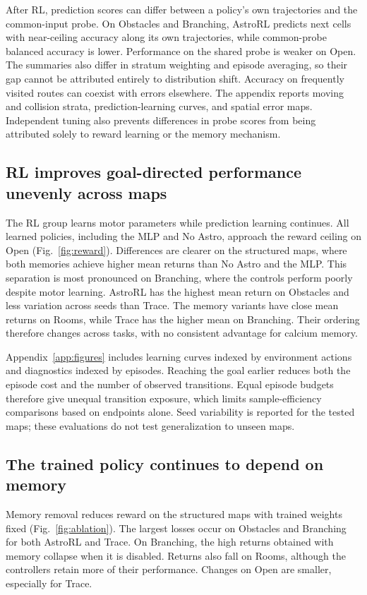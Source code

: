 After RL, prediction scores can differ between a policy's own trajectories and the common-input probe. On Obstacles and Branching, AstroRL predicts next cells with near-ceiling accuracy along its own trajectories, while common-probe balanced accuracy is lower. Performance on the shared probe is weaker on Open. The summaries also differ in stratum weighting and episode averaging, so their gap cannot be attributed entirely to distribution shift. Accuracy on frequently visited routes can coexist with errors elsewhere. The appendix reports moving and collision strata, prediction-learning curves, and spatial error maps. Independent tuning also prevents differences in probe scores from being attributed solely to reward learning or the memory mechanism.



\subsection{RL improves goal-directed performance unevenly across maps}
The RL group learns motor parameters while prediction learning continues. All learned policies, including the MLP and No Astro, approach the reward ceiling on Open (Fig.~\ref{fig:reward}). Differences are clearer on the structured maps, where both memories achieve higher mean returns than No Astro and the MLP. This separation is most pronounced on Branching, where the controls perform poorly despite motor learning. AstroRL has the highest mean return on Obstacles and less variation across seeds than Trace. The memory variants have close mean returns on Rooms, while Trace has the higher mean on Branching. Their ordering therefore changes across tasks, with no consistent advantage for calcium memory.

Appendix~\ref{app:figures} includes learning curves indexed by environment actions and diagnostics indexed by episodes. Reaching the goal earlier reduces both the episode cost and the number of observed transitions. Equal episode budgets therefore give unequal transition exposure, which limits sample-efficiency comparisons based on endpoints alone. Seed variability is reported for the tested maps; these evaluations do not test generalization to unseen maps.



\subsection{The trained policy continues to depend on memory}
Memory removal reduces reward on the structured maps with trained weights fixed (Fig.~\ref{fig:ablation}). The largest losses occur on Obstacles and Branching for both AstroRL and Trace. On Branching, the high returns obtained with memory collapse when it is disabled. Returns also fall on Rooms, although the controllers retain more of their performance. Changes on Open are smaller, especially for Trace.


